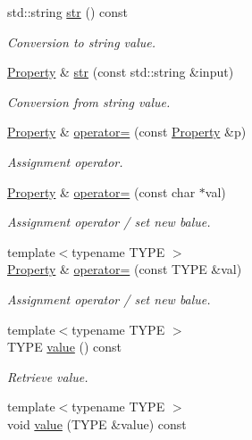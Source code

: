 \begin{DoxyCompactItemize}
std\+::string \hyperlink{class_d_d4hep_1_1_property_aa1e6042a1251c6544fcfef41b3ff5f47}{str} () const
\begin{DoxyCompactList}\small\item\em Conversion to string value. \end{DoxyCompactList}\item 
\hyperlink{class_d_d4hep_1_1_property}{Property} \& \hyperlink{class_d_d4hep_1_1_property_a4f4d25269959d15fb6b6c9cf581ee2a4}{str} (const std\+::string \&input)
\begin{DoxyCompactList}\small\item\em Conversion from string value. \end{DoxyCompactList}\item 
\hyperlink{class_d_d4hep_1_1_property}{Property} \& \hyperlink{class_d_d4hep_1_1_property_a18c732c983b1ae9f1c1cc801e6e17706}{operator=} (const \hyperlink{class_d_d4hep_1_1_property}{Property} \&p)
\begin{DoxyCompactList}\small\item\em Assignment operator. \end{DoxyCompactList}\item 
\hyperlink{class_d_d4hep_1_1_property}{Property} \& \hyperlink{class_d_d4hep_1_1_property_a5b6de39455110bc81a239a92115d816e}{operator=} (const char $\ast$val)
\begin{DoxyCompactList}\small\item\em Assignment operator / set new balue. \end{DoxyCompactList}\item 
{\footnotesize template$<$typename T\+Y\+PE $>$ }\\\hyperlink{class_d_d4hep_1_1_property}{Property} \& \hyperlink{class_d_d4hep_1_1_property_ae8fa36300ef0ce1673dcf70bda7e953e}{operator=} (const T\+Y\+PE \&val)
\begin{DoxyCompactList}\small\item\em Assignment operator / set new balue. \end{DoxyCompactList}\item 
{\footnotesize template$<$typename T\+Y\+PE $>$ }\\T\+Y\+PE \hyperlink{class_d_d4hep_1_1_property_a5caa53b1278d2e91da0606fbb312f967}{value} () const
\begin{DoxyCompactList}\small\item\em Retrieve value. \end{DoxyCompactList}\item 
{\footnotesize template$<$typename T\+Y\+PE $>$ }\\void \hyperlink{class_d_d4hep_1_1_property_aec0b744590dd9a7b2eb66dc733728c18}{value} (T\+Y\+PE \&value) const

\end{DoxyCompactItemize}
